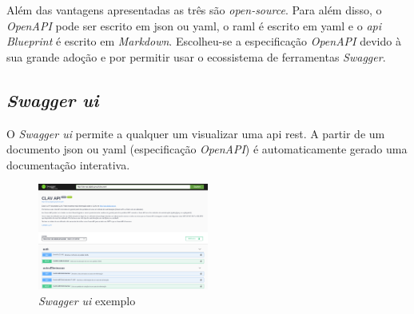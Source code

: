 Além das vantagens apresentadas as três são \textit{open-source}. Para além disso, o \textit{OpenAPI} pode ser escrito em \acrshort{json} ou \acrshort{yaml}, o \acrshort{raml} é escrito em \acrshort{yaml} e o \textit{\acrshort{api} Blueprint} é escrito em \textit{Markdown}. Escolheu-se a especificação \textit{OpenAPI} devido à sua grande adoção e por permitir usar o ecossistema de ferramentas \textit{Swagger}.

\subsection{\textit{Swagger \acrshort{ui}}}

O \textit{Swagger \acrshort{ui}} permite a qualquer um visualizar uma \acrshort{api} \acrshort{rest}. A partir de um documento \acrshort{json} ou \acrshort{yaml} (especificação \textit{OpenAPI}) é automaticamente gerado uma documentação interativa.

\begin{figure}[H]
    \begin{center}
        \includegraphics[width=0.5\textwidth]{img/swaggerUI.png}
    \end{center}
    \caption{\textit{Swagger \acrshort{ui}} exemplo}
\end{figure}

